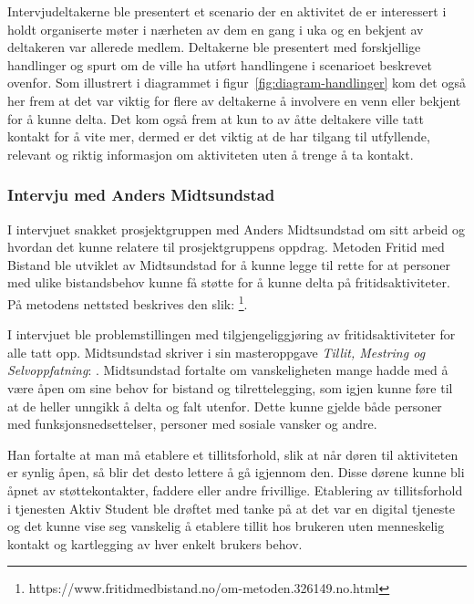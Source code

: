 Intervjudeltakerne ble presentert et scenario der en aktivitet de er interessert i holdt organiserte møter i nærheten av dem en gang i uka og en bekjent av deltakeren var allerede medlem. Deltakerne ble presentert med forskjellige handlinger og spurt om de ville ha utført handlingene i scenarioet beskrevet ovenfor. Som illustrert i diagrammet i figur~\ref{fig:diagram-handlinger} kom det også her frem at det var viktig for flere av deltakerne å involvere en venn eller bekjent for å kunne delta. Det kom også frem at kun to av åtte deltakere ville tatt kontakt for å vite mer, dermed er det viktig at de har tilgang til utfyllende, relevant og riktig informasjon om aktiviteten uten å trenge å ta kontakt.

\subsubsection{Intervju med Anders Midtsundstad}
I intervjuet snakket prosjektgruppen med Anders Midtsundstad om sitt arbeid og hvordan det kunne relatere til prosjektgruppens oppdrag. Metoden Fritid med Bistand ble utviklet av Midtsundstad for å kunne legge til rette for at personer med ulike bistandsbehov kunne få støtte for å kunne delta på fritidsaktiviteter. På metodens nettsted beskrives den slik:  \footnote{https://www.fritidmedbistand.no/om-metoden.326149.no.html}. 

I intervjuet ble problemstillingen med tilgjengeliggjøring av fritidsaktiviteter for alle tatt opp. Midtsundstad skriver i sin masteroppgave {\em  Tillit, Mestring og Selvoppfatning}:  \cite{TILLIT:13}. Midtsundstad fortalte om vanskeligheten mange hadde med å være åpen om sine behov for bistand og tilrettelegging, som igjen kunne føre til at de heller unngikk å delta og falt utenfor. Dette kunne gjelde både personer med funksjonsnedsettelser, personer med sosiale vansker og andre. 

Han fortalte at man må etablere et tillitsforhold, slik at når døren til aktiviteten er synlig åpen, så blir det desto lettere å gå igjennom den. Disse dørene kunne bli åpnet av støttekontakter, faddere eller andre frivillige. Etablering av tillitsforhold i tjenesten Aktiv Student ble drøftet med tanke på at det var en digital tjeneste og det kunne vise seg vanskelig å etablere tillit hos brukeren uten menneskelig kontakt og kartlegging av hver enkelt brukers behov.

